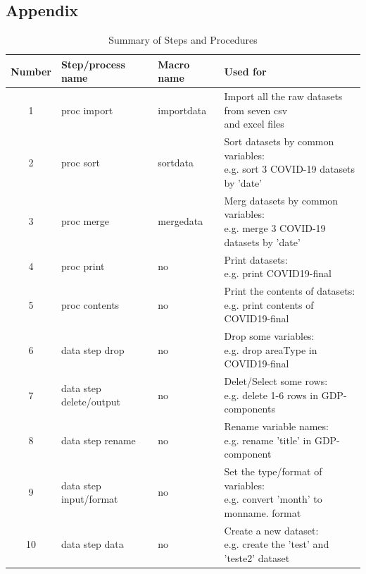 \documentclass[12pt, a4paper]{report}
\begin{document}
\begin{appendices}
\renewcommand\thefigure{\Alph{section}\arabic{figure}}  
\section{Appendix}
\setcounter{table}{0}
\begin{table}[H]
    \caption{Summary of Steps and Procedures}
    \begin{tabular}{|c|l|l|l|}
        \hline
        Number&Step/process name&Macro name&Used for\\
        \hline
        1&proc import&importdata&\makecell[l]{Import all the raw datasets from seven csv \\and excel files}\\
        \hline
        2&proc sort&sortdata&\makecell[l]{Sort datasets by common variables:\\e.g. sort 3 COVID-19 datasets by 'date'}\\
        \hline
        3&proc merge&mergedata&\makecell[l]{Merg datasets by common variables:\\e.g. merge 3 COVID-19 datasets by 'date'}\\
        \hline
        4&proc print&no&\makecell[l]{Print datasets:\\e.g. print COVID19-final}\\
        \hline
        5&proc contents&no&\makecell[l]{Print the contents of datasets:\\e.g. print contents of COVID19-final}\\
        \hline
        6&data step drop&no&\makecell[l]{Drop some variables:\\e.g. drop areaType in COVID19-final}\\
        \hline
        7&data step delete/output&no&\makecell[l]{Delet/Select some rows:\\e.g. delete 1-6 rows in GDP-components}\\
        \hline
        8&data step rename&no&\makecell[l]{Rename variable names:\\e.g. rename 'title' in GDP-component}\\
        \hline
        9&data step input/format&no&\makecell[l]{Set the type/format of variables:\\e.g. convert 'month' to monname. format}\\
        \hline
        10&data step data&no&\makecell[l]{Create a new dataset:\\e.g. create the 'test' and 'teste2' dataset}\\

\end{tabular}
\end{table}
\end{appendices}
\end{document}

